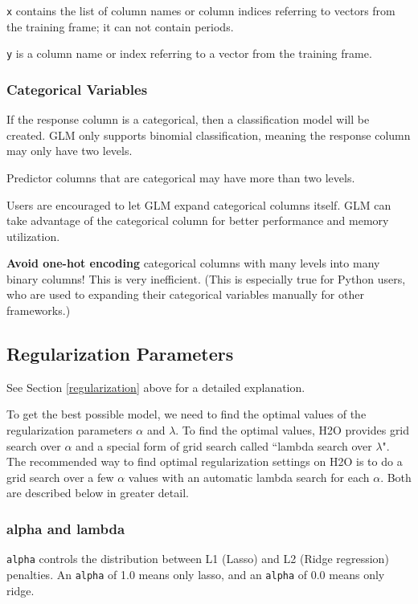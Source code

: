 \texttt{x} contains the list of column names or column indices referring to vectors from the training frame; it can
not contain periods.

\texttt{y} is a column name or index referring to a vector from the training frame.

\subsubsection{Categorical Variables}

If the response column is a categorical, then a classification model will be created.  GLM only supports binomial
classification, meaning the response column may only have two levels.

Predictor columns that are categorical may have more than two levels.

Users are encouraged to let GLM expand categorical columns itself.  GLM can take advantage of the categorical
column for better performance and memory utilization.

\textbf{Avoid one-hot encoding} categorical columns with many levels into many binary columns!  This is very
inefficient.  (This is especially true for Python users, who are used to expanding their categorical variables
manually for other frameworks.)

\subsection{Regularization Parameters}

See Section \ref{regularization} above for a detailed explanation.

To get the best possible model, we need to find the optimal values of the regularization parameters $\alpha$ and
$\lambda$.  To find the optimal values, H2O provides grid search over $\alpha$ and a special form of grid search
called ``lambda search over $\lambda$". The recommended way to find optimal regularization settings on H2O is to do
a grid search over a few $\alpha$ values with an automatic lambda search for each $\alpha$. Both are described
below in greater detail.

\subsubsection{alpha and lambda}

\texttt{alpha} controls the distribution between L1 (Lasso) and L2 (Ridge regression) penalties.  An \texttt{alpha} 
of 1.0 means only lasso, and an \texttt{alpha} of 0.0 means only ridge.


